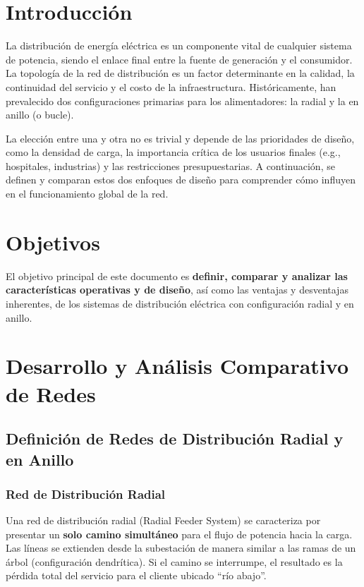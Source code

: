 \section{Introducción}

La distribución de energía eléctrica es un componente vital de cualquier sistema de potencia, siendo el enlace final entre la fuente de generación y el consumidor. La topología de la red de distribución es un factor determinante en la calidad, la continuidad del servicio y el costo de la infraestructura. Históricamente, han prevalecido dos configuraciones primarias para los alimentadores: la radial y la en anillo (o bucle).

La elección entre una y otra no es trivial y depende de las prioridades de diseño, como la densidad de carga, la importancia crítica de los usuarios finales (e.g., hospitales, industrias) y las restricciones presupuestarias. A continuación, se definen y comparan estos dos enfoques de diseño para comprender cómo influyen en el funcionamiento global de la red.

\section{Objetivos}

El objetivo principal de este documento es \textbf{definir, comparar y analizar las características operativas y de diseño}, así como las ventajas y desventajas inherentes, de los sistemas de distribución eléctrica con configuración radial y en anillo.

\section{Desarrollo y Análisis Comparativo de Redes}

\subsection{Definición de Redes de Distribución Radial y en Anillo}

\subsubsection{Red de Distribución Radial}
Una red de distribución radial (Radial Feeder System) se caracteriza por presentar un \textbf{solo camino simultáneo} para el flujo de potencia hacia la carga. Las líneas se extienden desde la subestación de manera similar a las ramas de un árbol (configuración dendrítica). Si el camino se interrumpe, el resultado es la pérdida total del servicio para el cliente ubicado ``río abajo''.

